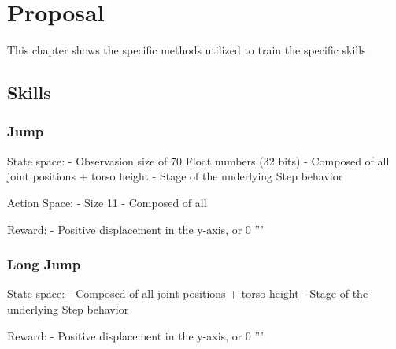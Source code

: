 \chapter{Proposal}
\label{cap:Proposal}



This chapter shows the specific methods utilized to train the specific skills
\section{Skills}

\subsection{Jump}


State space:
- Observasion size of 70 Float numbers (32 bits)
- Composed of all joint positions + torso height
- Stage of the underlying Step behavior

Action Space:
- Size 11
- Composed of all 

Reward:
- Positive displacement in the y-axis, or 0
'''

\subsection{Long Jump}

State space:
- Composed of all joint positions + torso height
- Stage of the underlying Step behavior

Reward:
- Positive displacement in the y-axis, or 0
'''